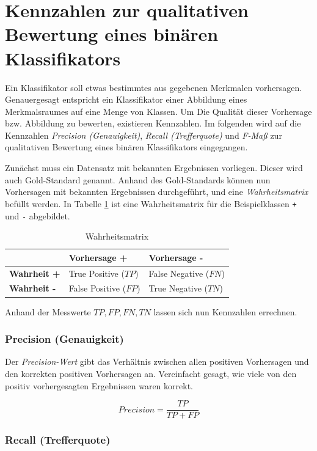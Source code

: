 \section{Kennzahlen zur qualitativen Bewertung eines binären Klassifikators}
\label{sec:appenix:fmeasure}

Ein Klassifikator soll etwas bestimmtes aus gegebenen Merkmalen vorhersagen.
Genauergesagt entspricht ein Klassifikator einer Abbildung eines Merkmalsraumes auf eine Menge von Klassen.
Um Die Qualität dieser Vorhersage bzw. Abbildung zu bewerten, existieren Kennzahlen.
Im folgenden wird auf die Kennzahlen \textit{Precision (Genauigkeit)}, \textit{Recall (Trefferquote)} und \textit{F-Maß} zur qualitativen Bewertung eines binären Klassifikators eingegangen.

Zunächst muss ein Datensatz mit bekannten Ergebnissen vorliegen.
Dieser wird auch Gold-Standard genannt.
Anhand des Gold-Standards können nun Vorhersagen mit bekannten Ergebnissen durchgeführt, und eine \textit{Wahrheitsmatrix} befüllt werden. In Tabelle \ref{tab:wahrheitsmatrix} ist eine Wahrheitsmatrix für die Beispielklassen \texttt{+} und \texttt{-} abgebildet. 
\begin{table}[]
\centering
\caption{Wahrheitsmatrix}
\label{tab:wahrheitsmatrix}
\begin{tabular}{|l|l|l|}
\hline
\textbf{}           & \textbf{Vorhersage +} & \textbf{Vorhersage -} \\ \hline
\textbf{Wahrheit +} & True Positive ($TP$)    & False Negative ($FN$)   \\ \hline
\textbf{Wahrheit -} & False Positive ($FP$)   & True Negative ($TN$)    \\ \hline
\end{tabular}
\end{table}

Anhand der Messwerte $TP, FP, FN, TN$ lassen sich nun Kennzahlen errechnen.

\subsubsection{Precision (Genauigkeit)}

Der \textit{Precision-Wert} gibt das Verhältnis zwischen allen positiven Vorhersagen und den korrekten positiven Vorhersagen an. Vereinfacht gesagt, wie viele von den positiv vorhergesagten Ergebnissen waren korrekt.

$$Precision = \frac{TP}{TP + FP}$$

\subsubsection{Recall (Trefferquote)}

